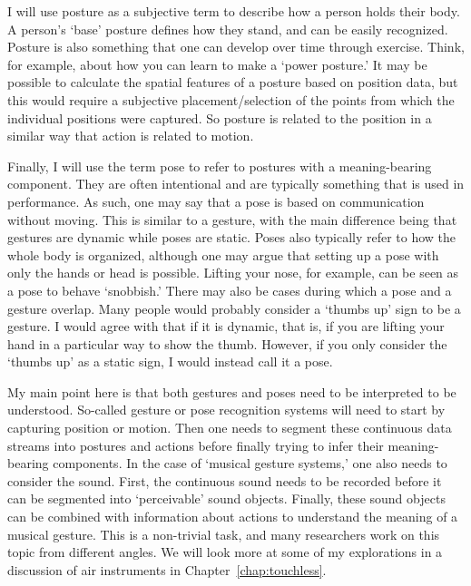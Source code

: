 I will use posture as a subjective term to describe how a person holds their body. A person's `base' posture defines how they stand, and can be easily recognized. Posture is also something that one can develop over time through exercise. Think, for example, about how you can learn to make a `power posture.' It may be possible to calculate the spatial features of a posture based on position data, but this would require a subjective placement/selection of the points from which the individual positions were captured. So posture is related to the position in a similar way that action is related to motion.

Finally, I will use the term pose to refer to postures with a meaning-bearing component. They are often intentional and are typically something that is used in performance. As such, one may say that a pose is based on communication without moving. This is similar to a gesture, with the main difference being that gestures are dynamic while poses are static. Poses also typically refer to how the whole body is organized, although one may argue that setting up a pose with only the hands or head is possible. Lifting your nose, for example, can be seen as a pose to behave `snobbish.' There may also be cases during which a pose and a gesture overlap. Many people would probably consider a `thumbs up' sign to be a gesture. I would agree with that if it is dynamic, that is, if you are lifting your hand in a particular way to show the thumb. However, if you only consider the `thumbs up' as a static sign, I would instead call it a pose.

My main point here is that both gestures and poses need to be interpreted to be understood.
So-called gesture or pose recognition systems will need to start by capturing position or motion. Then one needs to segment these continuous data streams into postures and actions before finally trying to infer their meaning-bearing components. In the case of `musical gesture systems,' one also needs to consider the sound. First, the continuous sound needs to be recorded before it can be segmented into `perceivable' sound objects. Finally, these sound objects can be combined with information about actions to understand the meaning of a musical gesture. This is a non-trivial task, and many researchers work on this topic from different angles. We will look more at some of my explorations in a discussion of air instruments in Chapter~\ref{chap:touchless}.

